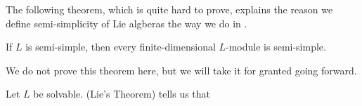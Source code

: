 The following theorem, which is quite hard to prove, explains the reason we define semi-simplicity of Lie algberas the way we do in .

\begin{boxtheorem}\label{Ch2:Thm:SemiSimpleLieToModule}
    If $L$ is semi-simple, then every finite-dimensional $L$-module is semi-simple.
\end{boxtheorem}

We do not prove this theorem here, but we will take it for granted going forward.

\begin{boxexample}
    Let $L$ be solvable.  (Lie's Theorem) tells us that \sorry %
\end{boxexample}


